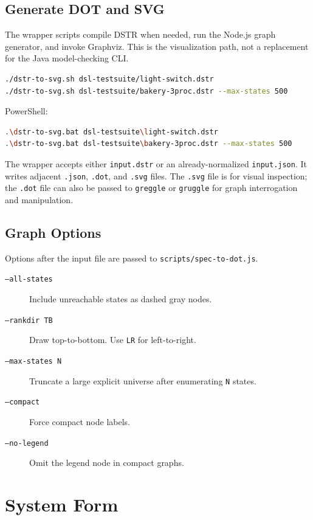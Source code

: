 \documentclass[11pt]{article}
\begin{document}
\subsection{Generate DOT and SVG}

The wrapper scripts compile DSTR when needed, run the Node.js graph generator,
and invoke Graphviz.  This is the visualization path, not a replacement for
the Java model-checking CLI.

\begin{lstlisting}[language=bash]
./dstr-to-svg.sh dsl-testsuite/light-switch.dstr
./dstr-to-svg.sh dsl-testsuite/bakery-3proc.dstr --max-states 500
\end{lstlisting}

PowerShell:

\begin{lstlisting}[language=bash]
.\dstr-to-svg.bat dsl-testsuite\light-switch.dstr
.\dstr-to-svg.bat dsl-testsuite\bakery-3proc.dstr --max-states 500
\end{lstlisting}

The wrapper accepts either \texttt{input.dstr} or an already-normalized
\texttt{input.json}.  It writes adjacent \texttt{.json}, \texttt{.dot}, and
\texttt{.svg} files.  The \texttt{.svg} file is for visual inspection; the
\texttt{.dot} file can also be passed to \texttt{greggle} or \texttt{gruggle}
for graph interrogation and manipulation.

\subsection{Graph Options}

Options after the input file are passed to \texttt{scripts/spec-to-dot.js}.

\begin{description}
\item[\texttt{--all-states}] Include unreachable states as dashed gray nodes.
\item[\texttt{--rankdir TB}] Draw top-to-bottom.  Use \texttt{LR} for
  left-to-right.
\item[\texttt{--max-states N}] Truncate a large explicit universe after
  enumerating \texttt{N} states.
\item[\texttt{--compact}] Force compact node labels.
\item[\texttt{--no-legend}] Omit the legend node in compact graphs.
\end{description}

\section{System Form}
\end{document}
